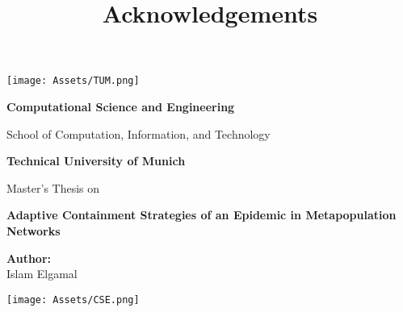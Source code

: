 
% 
\begin{titlepage}
    \centering
    \vspace*{1cm}
    
    \texttt{[image: Assets/TUM.png]}
    
    \vspace{.25cm}
    \LARGE
    \textbf{Computational Science and Engineering}
    
    \vspace{.5cm}
    \Large
    School of Computation, Information, and Technology
    
    \vspace{1.5cm}
    
    \textbf{Technical University of Munich}
    
    \vspace{2cm}
    
    \Large
    Master's Thesis on
    
    \vspace{0.5cm}
    
    \textbf{Adaptive Containment Strategies of an Epidemic in Metapopulation Networks}
    
    \vspace{2cm}
    
    \Large
    \textbf{Author:} \\
    Islam Elgamal
    \vspace{2cm}
    
    \texttt{[image: Assets/CSE.png]}
    
    \vspace{1cm}
    
\end{titlepage}
\newpage
\title{Acknowledgements}

% 